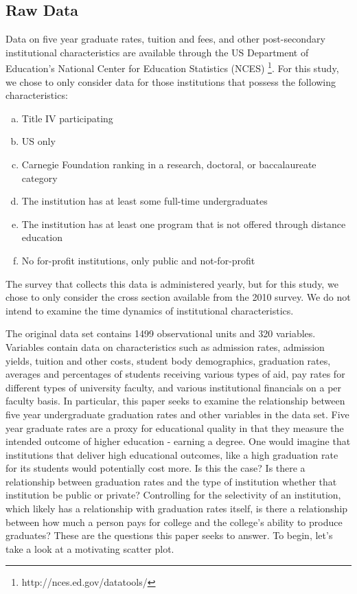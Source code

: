 \documentclass{article}
\begin{document}
\subsection{Raw Data}
Data on five year graduate rates, tuition and fees, and other post-secondary institutional characteristics are available through the US Department of Education's National Center for Education Statistics (NCES) \footnote{http://nces.ed.gov/datatools/}. For this study, we chose to only consider data for those institutions that possess the following characteristics:

\begin{enumerate}[a)]
\item{} Title IV participating
\item{} US only
\item{} Carnegie Foundation ranking in a research, doctoral, or baccalaureate category
\item{} The institution has at least some full-time undergraduates
\item{} The institution has at least one program that is not offered through distance education
\item{} No for-profit institutions, only public and not-for-profit
\end{enumerate}

The survey that collects this data is administered yearly, but for this study, we chose to only consider the cross section available from the 2010 survey. We do not intend to examine the time dynamics of institutional characteristics.

The original data set contains 1499 observational units and 320 variables. Variables contain data on characteristics such as admission rates, admission yields, tuition and other costs, student body demographics, graduation rates, averages and percentages of students receiving various types of aid, pay rates for different types of university faculty, and various institutional financials on a per faculty basis. In particular, this paper seeks to examine the relationship between five year undergraduate graduation rates and other variables in the data set. Five year graduate rates are a proxy for educational quality in that they measure the intended outcome of higher education - earning a degree. One would imagine that institutions that deliver high educational outcomes, like a high graduation rate for its students would potentially cost more. Is this the case? Is there a relationship between graduation rates and the type of institution whether that institution be public or private? Controlling for the selectivity of an institution, which likely has a relationship with graduation rates itself, is there a relationship between how much a person pays for college and the college's ability to produce graduates? These are the questions this paper seeks to answer. To begin, let's take a look at a motivating scatter plot. 
\end{document}
